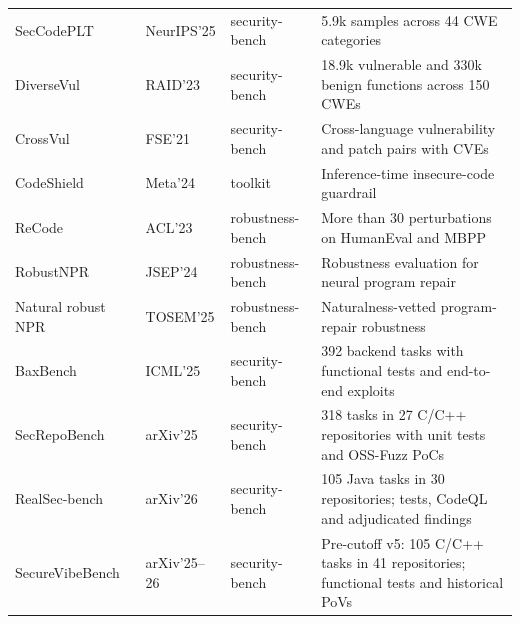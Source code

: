 \documentclass[acmsmall,screen,review,nonacm]{acmart}
\begin{document}
{\begin{longtable}{@{}L{2.65cm} L{1.75cm} L{2.40cm} L{4.85cm}@{}}
SecCodePLT~\cite{seccodeplt2024} & NeurIPS'25 & security-bench & 5.9k samples across 44 CWE categories \\
DiverseVul~\cite{chen2023diversevul} & RAID'23 & security-bench & 18.9k vulnerable and 330k benign functions across 150 CWEs \\
CrossVul~\cite{crossvul2021} & FSE'21 & security-bench & Cross-language vulnerability and patch pairs with CVEs \\
CodeShield~\cite{codeshield2024} & Meta'24 & toolkit & Inference-time insecure-code guardrail \\
ReCode~\cite{wang2023recode} & ACL'23 & robustness-bench & More than 30 perturbations on HumanEval and MBPP \\
RobustNPR~\cite{robustnpr2024} & JSEP'24 & robustness-bench & Robustness evaluation for neural program repair \\
Natural robust NPR~\cite{naturalnpr2025} & TOSEM'25 & robustness-bench & Naturalness-vetted program-repair robustness \\
BaxBench~\cite{baxbench2025} & ICML'25 & security-bench & 392 backend tasks with functional tests and end-to-end exploits \\
SecRepo\allowbreak Bench~\cite{secrepobench2025} & arXiv'25 & security-bench & 318 tasks in 27 C/C++ repositories with unit tests and OSS-Fuzz PoCs \\
RealSec-bench~\cite{wang2026realsec} & arXiv'26 & security-bench & 105 Java tasks in 30 repositories; tests, CodeQL and adjudicated findings \\
SecureVibeBench~\cite{secureagentbench2025} & arXiv'25--26 & security-bench & Pre-cutoff v5: 105 C/C++ tasks in 41 repositories; functional tests and historical PoVs \\
\end{longtable}
}
\end{document}
